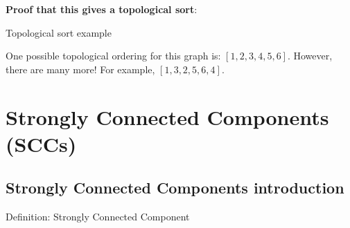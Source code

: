 \documentclass{article}
\begin{document}
\textbf{Proof that this gives a topological sort}:

\vspace{22mm}

\begin{example}{Topological sort example} 
    \centering
    \begin{minipage}{0.4\linewidth}
    \centering
    \end{minipage}
    \begin{minipage}{0.4\linewidth}
    \centering
    One possible topological ordering for this graph is: $[1, 2, 3, 4, 5, 6]$. However, there are many more! For example, $[1, 3, 2, 5, 6, 4]$.
    \end{minipage}
\end{example}


\newpage

\section{Strongly Connected Components (SCCs)}
\subsection{Strongly Connected Components introduction}

\begin{definition}{Definition: Strongly Connected Component}
   \vspace{8mm}
\end{definition}
\end{document}
